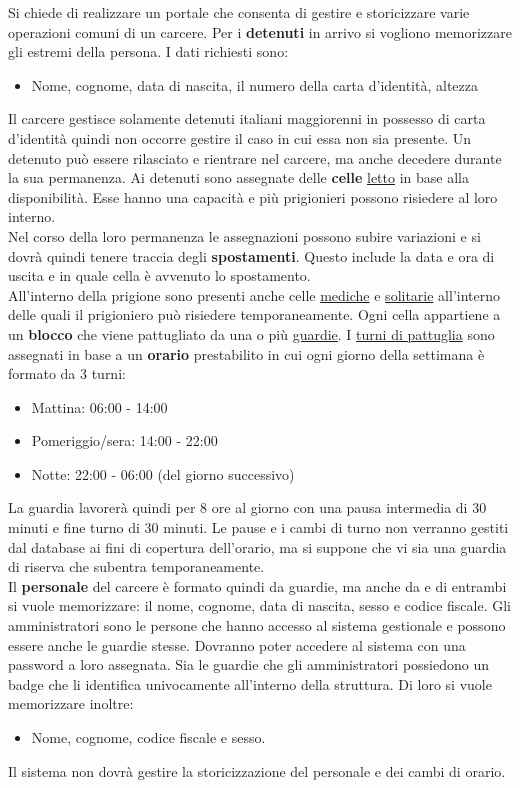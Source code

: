 \documentclass[a4paper,12pt]{report}
\begin{document}
\begin{linenumbers}
\modulolinenumbers[5]
Si chiede di realizzare un portale che consenta di gestire e storicizzare varie operazioni comuni di un carcere. Per i \textbf{detenuti} in arrivo si vogliono memorizzare gli estremi della persona.
%
I dati richiesti sono:
\begin{itemize}
    \item Nome, cognome, data di nascita, il numero della carta d'identità, altezza
\end{itemize}
Il carcere gestisce solamente detenuti italiani maggiorenni in possesso di carta d'identità quindi non occorre gestire il caso in cui essa non sia presente.
%
Un detenuto può essere rilasciato e rientrare nel carcere, ma anche decedere durante la sua permanenza.
%
Ai detenuti sono assegnate delle \textbf{celle} \underline{letto} in base alla disponibilità.
%
Esse hanno una capacità e più prigionieri possono risiedere al loro interno.
%
\\Nel corso della loro permanenza le assegnazioni possono subire variazioni e si dovrà quindi tenere traccia degli \textbf{spostamenti}.
%
Questo include la data e ora di uscita e in quale cella è avvenuto lo spostamento.
%
\\All'interno della prigione sono presenti anche celle \underline{mediche} e \underline{solitarie} all'interno delle quali il prigioniero può risiedere temporaneamente.
%
Ogni cella appartiene a un \textbf{blocco} che viene pattugliato da una o più \underline{guardie}.
%
I \underline{turni di pattuglia} sono assegnati in base a un \textbf{orario} prestabilito in cui ogni giorno della settimana è formato da 3 turni:
\begin{itemize}
    \item Mattina: 06:00 - 14:00
    \item Pomeriggio/sera: 14:00 - 22:00
    \item Notte: 22:00 - 06:00 (del giorno successivo)
\end{itemize}   
La guardia lavorerà quindi per 8 ore al giorno con una pausa intermedia di 30 minuti e fine turno di 30 minuti.
%
Le pause e i cambi di turno non verranno gestiti dal database ai fini di copertura dell'orario, ma si suppone che vi sia una guardia di riserva che subentra temporaneamente.
%
\\Il \textbf{personale} del carcere è formato quindi da guardie, ma anche da  e di entrambi si vuole memorizzare: il nome, cognome, data di nascita, sesso e codice fiscale.
%
Gli amministratori sono le persone che hanno accesso al sistema gestionale e possono essere anche le guardie stesse.
%
Dovranno poter accedere al sistema con una password a loro assegnata.
%
Sia le guardie che gli amministratori possiedono un badge che li identifica univocamente all'interno della struttura.
%
Di loro si vuole memorizzare inoltre:
\begin{itemize}
    \item Nome, cognome, codice fiscale e sesso.
\end{itemize}
Il sistema non dovrà gestire la storicizzazione del personale e dei cambi di orario.
\end{linenumbers}
\end{document}
